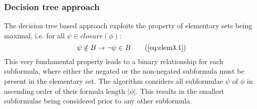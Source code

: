 \subsubsection{Decision tree approach}\label{sec:methods-dt}
The decision tree based approach exploits the property of elementary sets being maximal, i.e. for all $\psi \in closure(\phi)$:
\begin{equation*}
  \psi \notin B \imply \lnot \psi \in B \tag{\autoref{eq:elem3.1}}
\end{equation*}
This very fundamental property leads to a binary relationship for each subformula, where either the negated or the non-negated subformula must be present in the elementary set. The algorithm considers all subformulae $\psi$ of $\phi$ in ascending order of their formula length $|\phi|$. This results in the smallest subformulae being considered prior to any other subformula.

